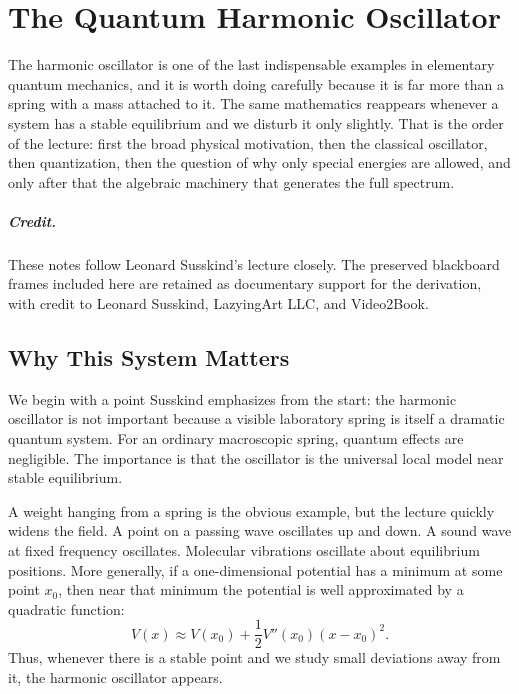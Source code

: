 \chapter{The Quantum Harmonic Oscillator}

The harmonic oscillator is one of the last indispensable examples in elementary quantum mechanics, and it is worth doing carefully because it is far more than a spring with a mass attached to it. The same mathematics reappears whenever a system has a stable equilibrium and we disturb it only slightly. That is the order of the lecture: first the broad physical motivation, then the classical oscillator, then quantization, then the question of why only special energies are allowed, and only after that the algebraic machinery that generates the full spectrum.

\paragraph{Credit.} These notes follow Leonard Susskind's lecture closely. The preserved blackboard frames included here are retained as documentary support for the derivation, with credit to Leonard Susskind, LazyingArt LLC, and Video2Book.

\section{Why This System Matters}

We begin with a point Susskind emphasizes from the start: the harmonic oscillator is not important because a visible laboratory spring is itself a dramatic quantum system. For an ordinary macroscopic spring, quantum effects are negligible. The importance is that the oscillator is the universal local model near stable equilibrium.

A weight hanging from a spring is the obvious example, but the lecture quickly widens the field. A point on a passing wave oscillates up and down. A sound wave at fixed frequency oscillates. Molecular vibrations oscillate about equilibrium positions. More generally, if a one-dimensional potential has a minimum at some point \(x_{0}\), then near that minimum the potential is well approximated by a quadratic function:
\begin{equation}
V(x)\approx V(x_{0})+\frac{1}{2}V''(x_{0})(x-x_{0})^{2}.
\end{equation}
Thus, whenever there is a stable point and we study small deviations away from it, the harmonic oscillator appears.

